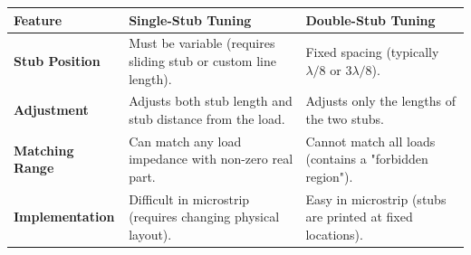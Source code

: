 \documentclass[12pt,a4paper]{article}
\renewcommand{\arraystretch}{1.45}
\begin{document}
\begin{tcolorbox}[tikzbox, title={Comparison of Single-Stub and Double-Stub Tuning}]
\renewcommand{\arraystretch}{1.4}
\par\noindent
{\renewcommand{\arraystretch}{1.55}%
\begin{tabularx}{\linewidth}{|B{3.2cm}|Y|Y|}\hline
\textbf{Feature} & \textbf{\color{myteal}Single-Stub Tuning} & \textbf{\color{myamber}Double-Stub Tuning} \\[4pt]
\hline
\textbf{Stub Position} & Must be variable (requires sliding stub or custom line length). & Fixed spacing (typically $\lambda/8$ or $3\lambda/8$). \\[4pt]
\hline
\textbf{Adjustment} & Adjusts both stub length and stub distance from the load. & Adjusts only the lengths of the two stubs. \\[4pt]
\hline
\textbf{Matching Range} & Can match any load impedance with non-zero real part. & Cannot match all loads (contains a "forbidden region"). \\[4pt]
\hline
\textbf{Implementation} & Difficult in microstrip (requires changing physical layout). & Easy in microstrip (stubs are printed at fixed locations). \\[4pt]
\hline
\end{tabularx}
}
\end{tcolorbox}
\end{document}
